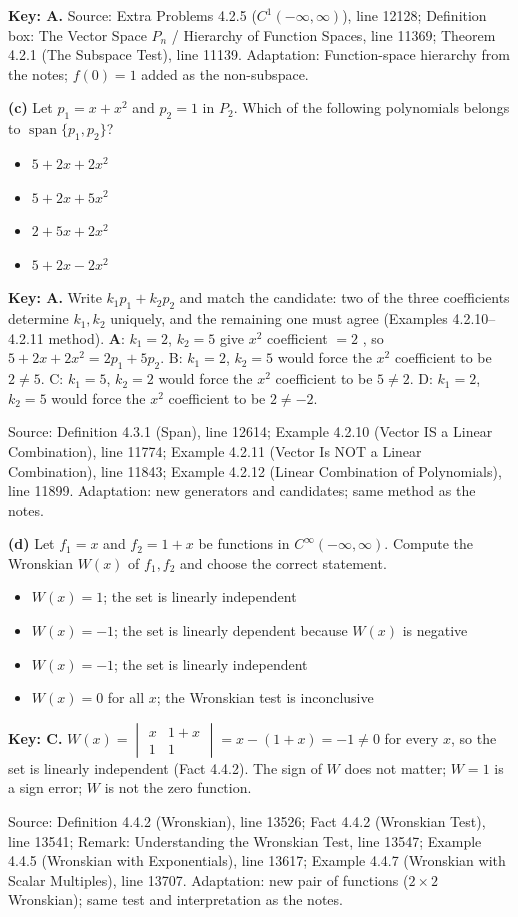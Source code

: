 \documentclass[11pt,a4paper]{article}
\newcommand{\Src}[1]{{\footnotesize\color{black!65}Source: #1}}
\begin{document}
\textbf{Key: A.} \Src{Extra Problems 4.2.5 ($C^1(-\infty,\infty)$), line 12128; Definition box: The Vector Space $P_n$ / Hierarchy of Function Spaces, line 11369; Theorem 4.2.1 (The Subspace Test), line 11139. Adaptation: Function-space hierarchy from the notes; $f(0)=1$ added as the non-subspace.}\par
\textbf{(c)} Let $p_1=x+x^{2}$ and $p_2=1$ in $P_2$. Which of the following polynomials belongs to $\operatorname{span}\{p_1,p_2\}$?\par
\begin{itemize}[leftmargin=8mm,itemsep=0pt]\item[A$^{\ast}$] $5+2x+2x^{2}$\item[B] $5+2x+5x^{2}$\item[C] $2+5x+2x^{2}$\item[D] $5+2x-2x^{2}$\end{itemize}
\textbf{Key: A.} Write $k_1p_1+k_2p_2$ and match the candidate: two of the three coefficients determine $k_1,k_2$ uniquely, and the remaining one must agree (Examples 4.2.10--4.2.11 method). \textbf{A}: $k_1=2$, $k_2=5$ give $x^{2}$ coefficient $=2$ \checkmark, so $5+2x+2x^{2}=2p_1+5p_2$. B: $k_1=2$, $k_2=5$ would force the $x^{2}$ coefficient to be $2\neq5$. C: $k_1=5$, $k_2=2$ would force the $x^{2}$ coefficient to be $5\neq2$. D: $k_1=2$, $k_2=5$ would force the $x^{2}$ coefficient to be $2\neq-2$.\par
\Src{Definition 4.3.1 (Span), line 12614; Example 4.2.10 (Vector IS a Linear Combination), line 11774; Example 4.2.11 (Vector Is NOT a Linear Combination), line 11843; Example 4.2.12 (Linear Combination of Polynomials), line 11899. Adaptation: new generators and candidates; same method as the notes.}\par
\textbf{(d)} Let $f_1=x$ and $f_2=1+x$ be functions in $C^{\infty}(-\infty,\infty)$. Compute the Wronskian $W(x)$ of $f_1,f_2$ and choose the correct statement.\par
\begin{itemize}[leftmargin=8mm,itemsep=0pt]\item[A] $W(x)=1$; the set is linearly independent\item[B] $W(x)=-1$; the set is linearly dependent because $W(x)$ is negative\item[C$^{\ast}$] $W(x)=-1$; the set is linearly independent\item[D] $W(x)=0$ for all $x$; the Wronskian test is inconclusive\end{itemize}
\textbf{Key: C.} $W(x)=\begin{vmatrix}x&1+x\\1&1\end{vmatrix}=x-(1+x)=-1\neq0$ for every $x$, so the set is linearly independent (Fact 4.4.2). The sign of $W$ does not matter; $W=1$ is a sign error; $W$ is not the zero function.\par
\Src{Definition 4.4.2 (Wronskian), line 13526; Fact 4.4.2 (Wronskian Test), line 13541; Remark: Understanding the Wronskian Test, line 13547; Example 4.4.5 (Wronskian with Exponentials), line 13617; Example 4.4.7 (Wronskian with Scalar Multiples), line 13707. Adaptation: new pair of functions ($2\times2$ Wronskian); same test and interpretation as the notes.}\par
\end{document}
